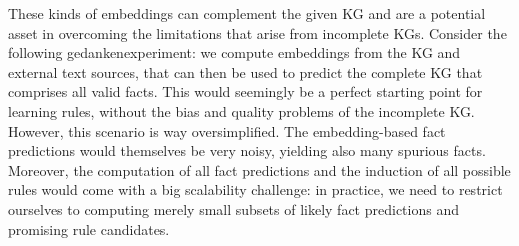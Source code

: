 These kinds of embeddings can complement the given KG and are a potential asset
in overcoming the limitations that arise from incomplete KGs.
Consider the following gedankenexperiment:
we compute embeddings from the KG and external text sources,
that can then be used to predict the complete KG that comprises all valid facts.
This would seemingly be a perfect starting point for learning rules,
without the bias and quality problems of the incomplete KG.
However, this scenario is way oversimplified.
The embedding-based fact predictions would themselves be very noisy,
yielding also many spurious facts.
Moreover, the computation of all fact predictions and the induction of all
possible rules would come with a big scalability challenge: in practice,
we need to restrict ourselves to computing merely 
small subsets of likely fact predictions
and promising rule candidates.







